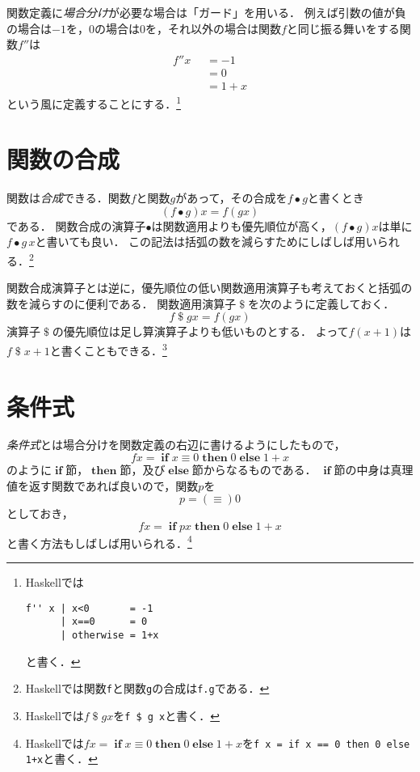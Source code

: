 \documentclass[twocolumn]{jsbook}
\newcommand{\keyword}[1]{\emph{#1}}
\newcommand{\code}[1]{\texttt{#1}}
\newcommand{\binaryeq}{\equiv}
\newcommand{\binaryl}{<}
\newcommand{\binarycompose}{\bullet}
\newcommand{\binaryapply}{\mathop{\$}}
\newcommand{\guard}[1]{\mathop{\mid_{#1}}}
\newcommand{\keywordname}[1]{\mathbf{#1}}
\newcommand{\keywordotherwise}{\keywordname{otherwise}}
\newcommand{\keywordif}{\mathop{\keywordname{if}}}
\newcommand{\keywordthen}{\mathop{\keywordname{then}}}
\newcommand{\keywordelse}{\mathop{\keywordname{else}}}
\begin{document}
関数定義に\keyword{場合分け}が必要な場合は「ガード」を用いる．
例えば引数の値が負の場合は$-1$を，$0$の場合は$0$を，それ以外の場合は関数$f$と同じ振る舞いをする関数$f''$は
\begin{equation*}
\begin{split}
f''x&\guard{x\binaryl0}=-1\\
&\guard{x\binaryeq0}=0\\
&\guard{\keywordotherwise}=1+x
\end{split}
\end{equation*}
という風に定義することにする．\footnote{Haskellでは
\begin{verbatim}
f'' x | x<0       = -1
      | x==0      = 0
      | otherwise = 1+x
\end{verbatim}
と書く．}

\section{関数の合成}

関数は\keyword{合成}できる．関数$f$と関数$g$があって，その合成を$f\binarycompose g$と書くとき$$(f\binarycompose g)x=f(gx)$$である．
関数合成の演算子$\binarycompose$は関数適用よりも優先順位が高く，$(f\binarycompose g)x$は単に$f\binarycompose g\,x$と書いても良い．
この記法は括弧の数を減らすためにしばしば用いられる．\footnote{Haskellでは関数\code{f}と関数\code{g}の合成は\code{f.g}である．}

関数合成演算子とは逆に，優先順位の低い関数適用演算子も考えておくと括弧の数を減らすのに便利である．
関数適用演算子$\binaryapply$を次のように定義しておく．
$$f\binaryapply gx=f(gx)$$
演算子$\binaryapply$の優先順位は足し算演算子よりも低いものとする．
よって$f(x+1)$は$f\binaryapply x+1$と書くこともできる．\footnote{Haskellでは$f\binaryapply gx$を\code{f \$ g x}と書く．}

\section{条件式}

\keyword{条件式}とは場合分けを関数定義の右辺に書けるようにしたもので，
$$fx=\keywordif x\binaryeq0\keywordthen0\keywordelse1+x$$
のように$\keywordif$節，$\keywordthen$節，及び$\keywordelse$節からなるものである．
$\keywordif$節の中身は真理値を返す関数であれば良いので，関数$p$を$$p=(\equiv)0$$としておき，$$fx=\keywordif px\keywordthen0\keywordelse 1+x$$と書く方法もしばしば用いられる．\footnote{Haskellでは$fx=\keywordif x\binaryeq0\keywordthen0\keywordelse1+x$を\code{f x = if x == 0 then 0 else 1+x}と書く．}
\end{document}
